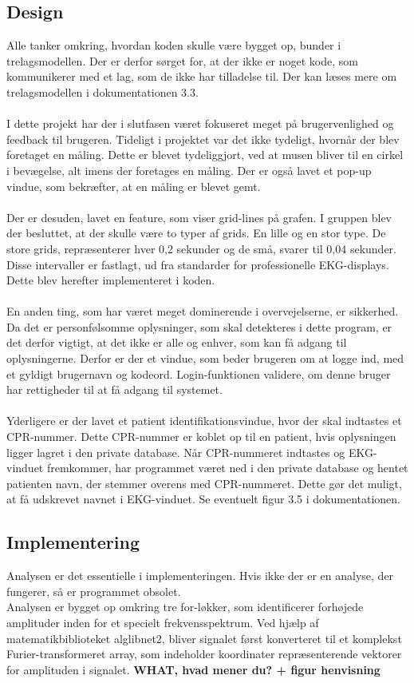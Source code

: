 \subsection{Design}
Alle tanker omkring, hvordan koden skulle være bygget op, bunder i trelagsmodellen. Der er derfor sørget for, at der ikke er noget kode, som kommunikerer med et lag, som de ikke har tilladelse til. Der kan læses mere om trelagsmodellen i dokumentationen 3.3.\\ \\
I dette projekt har der i slutfasen været fokuseret meget på brugervenlighed og feedback til brugeren. Tideligt i projektet var det ikke tydeligt, hvornår der blev foretaget en måling. Dette er blevet tydeliggjort, ved at musen bliver til en cirkel i bevægelse, alt imens der foretages en måling. Der er også lavet et pop-up vindue, som bekræfter, at en måling er blevet gemt.\\ \\
Der er desuden, lavet en feature, som viser grid-lines på grafen. I gruppen blev der besluttet, at der skulle være to typer af grids. En lille og en stor type.  De store grids, repræsenterer hver 0,2 sekunder og de små, svarer til 0,04 sekunder. Disse intervaller er fastlagt, ud fra standarder for professionelle EKG-displays.  Dette blev herefter implementeret i koden.\\ \\
En anden ting, som har været meget dominerende i overvejelserne, er sikkerhed. Da det er personfølsomme oplysninger, som skal detekteres i dette program, er det derfor vigtigt, at det ikke er alle og enhver, som kan få adgang til oplysningerne. Derfor er der et vindue, som beder brugeren om at logge ind, med et gyldigt brugernavn og kodeord. Login-funktionen validere, om denne bruger har rettigheder til at få adgang til systemet.\\ \\
Yderligere er der lavet et patient identifikationsvindue, hvor der skal indtastes et CPR-nummer. Dette CPR-nummer er koblet op til en patient, hvis oplysningen ligger lagret i den private database. Når CPR-nummeret indtastes og EKG-vinduet fremkommer, har programmet været ned i den private database og hentet patienten navn, der stemmer overens med CPR-nummeret. Dette gør det muligt, at få udskrevet navnet i EKG-vinduet. Se eventuelt figur 3.5 i dokumentationen.   

\subsection{Implementering}
Analysen er det essentielle i implementeringen. Hvis ikke der er en analyse, der fungerer, så er programmet obsolet.\\
Analysen er bygget op omkring tre for-løkker, som identificerer forhøjede amplituder inden for et specielt frekvensspektrum. Ved hjælp af matematikbiblioteket alglibnet2, bliver signalet først konverteret til et komplekst Furier-transformeret array, som indeholder koordinater repræsenterende vektorer for amplituden i signalet. \textbf{WHAT, hvad mener du? + figur henvisning} 

